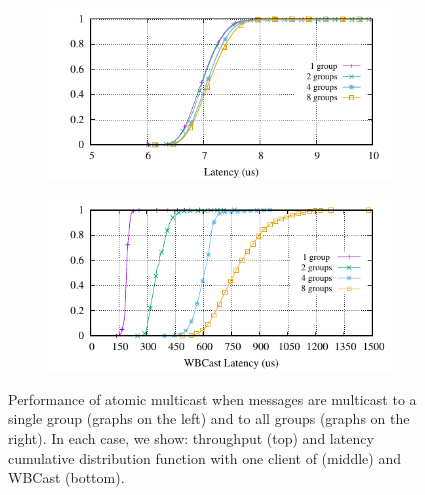 \begin{figure}[ht]
  \begin{subfigure}{\columnwidth}
    \centering
    \includegraphics[width=0.95\columnwidth]{figures/benchmark/graphs/figure-genuine-compare-latency-cdf}
  \end{subfigure}
  \begin{subfigure}{\columnwidth}
    \centering
    \includegraphics[width=0.95\columnwidth]{figures/benchmark/graphs/figure-multi-dest-compare-latency-cdf-WBCast}
  \end{subfigure}
  \caption{Performance of atomic multicast when messages are multicast to a single group (graphs on the left) and to all groups (graphs on the right). In each case, we show: throughput (top) and latency cumulative distribution function with one client of \libname (middle) and WBCast (bottom).}
  \label{fig:1group_message_size}
\end{figure}

